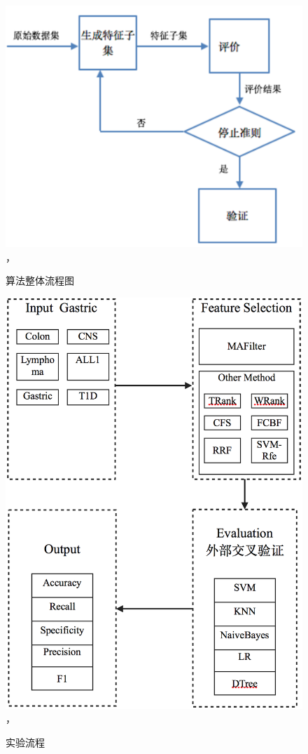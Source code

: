 \documentclass{njubachelor}
\begin{document}
\begin{figure}[!ht]
    \centering
    \includegraphics[width=4.5in]{pic/fig3}， 
    \caption{算法整体流程图}
\end{figure}

\begin{figure}[!ht]
    \centering
    \includegraphics[width=4.5in]{pic/fig4}， 
    \caption{实验流程}
\end{figure}
\end{document}
